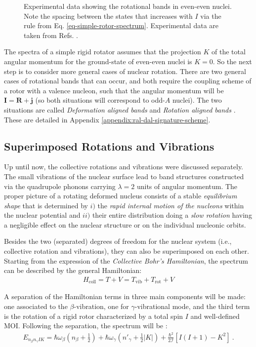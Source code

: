 \begin{figure}
    \caption{Experimental data showing the rotational bands in even-even nuclei. Note the spacing between the states that increases with $I$ via the rule from Eq. \ref{eq-simple-rotor-spectrum}. Experimental data are taken from Refs. \cite{nica2017nuclear,mccutchan2015nuclear}.}
    \label{rotational-bands-even-even}
\end{figure}

The spectra of a simple rigid rotator assumes that the projection $K$ of the total angular momentum for the ground-state of even-even nuclei is $K=0$. So the next step is to consider more general cases of nuclear rotation. There are two general cases of rotational bands that can occur, and both require the coupling scheme of a rotor with a valence nucleon, such that the angular momentum will be $\mathbf{I}=\mathbf{R}+\mathbf{j}$ (so both situations will correspond to odd-$A$ nuclei). The two situations are called \emph{Deformation aligned bands} and \emph{Rotation aligned bands} \cite{uwitonze2015assignment}. These are detailed in Appendix \ref{appendix:ral-dal-signature-scheme}.

\subsection{Superimposed Rotations and Vibrations}

Up until now, the collective rotations and vibrations were discussed separately. The small vibrations of the nuclear surface lead to band structures constructed via the quadrupole phonons carrying $\lambda=2$ units of angular momentum. The proper picture of a rotating deformed nucleus consists of a stable \emph{equilibrium shape} that is determined by $i)$ the \emph{rapid internal motion of the nucleons} within the nuclear potential and $ii)$ their entire distribution doing a \emph{slow rotation} having a negligible effect on the nuclear structure or on the individual nucleonic orbits.

Besides the two (separated) degrees of freedom for the nuclear system (i.e., collective rotation and vibrations), they can also be superimposed on each other. Starting from the expression of the \emph{Collective Bohr's Hamiltonian}, the spectrum can be described by the general Hamiltonian:
\begin{align}
    H_\text{coll}=T+V=T_\text{vib}+T_\text{rot}+V
\end{align}

A separation of the Hamiltonian terms in three main components will be made: one associated to the $\beta$-vibration, one for $\gamma$-vibrational mode, and the third term is the rotation of a rigid rotor characterized by a total spin $I$ and well-defined MOI. Following the separation, the spectrum will be \cite{ring2004nuclear,li2022model}:
\begin{align}
    E_{n_\beta n_\gamma IK}=\hbar\omega_\beta\left(n_\beta+\frac{1}{2}\right)+\hbar\omega_\gamma\left(n'_\gamma+\frac{1}{2}|K|\right)+\frac{\hbar^2}{2\mathcal{I}}\left[I(I+1)-K^2\right]\ .
    \label{collective-rotation-vibration-energy-spectrum}
\end{align}

